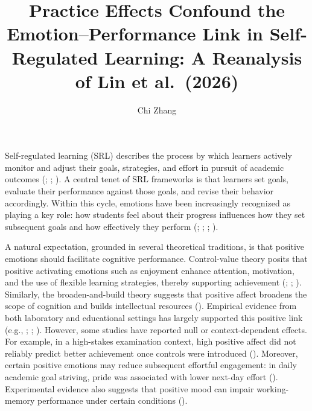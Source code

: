 \documentclass[
  man,
  floatsintext,
  longtable,
  nolmodern,
  notxfonts,
  notimes,
  colorlinks=true,linkcolor=blue,citecolor=blue,urlcolor=blue]{apa7}
\title{Practice Effects Confound the Emotion--Performance Link in
Self-Regulated Learning: A Reanalysis of Lin et al.~(2026)}
\author{Chi Zhang}
\affiliation{
{Manchester Institute of Education, The University of Manchester}}
\newlength{\cslhangindent}
\begin{document}
\maketitle




\setlength\LTleft{0pt}



\ifdefined\Shaded\renewenvironment{Shaded}{\begin{snugshade}\begin{singlespace}}{\end{singlespace}\end{snugshade}}\fi

\setlength{\cslhangindent}{0.5in}

Self-regulated learning (SRL) describes the process by which learners
actively monitor and adjust their goals, strategies, and effort in
pursuit of academic outcomes
(;
;
). A central tenet of
SRL frameworks is that learners set goals, evaluate their performance
against those goals, and revise their behavior accordingly. Within this
cycle, emotions have been increasingly recognized as playing a key role:
how students feel about their progress influences how they set
subsequent goals and how effectively they perform
(;
;
;
).

A natural expectation, grounded in several theoretical traditions, is
that positive emotions should facilitate cognitive performance.
Control-value theory posits that positive activating emotions such as
enjoyment enhance attention, motivation, and the use of flexible
learning strategies, thereby supporting achievement
(;
;
). Similarly, the
broaden-and-build theory suggests that positive affect broadens the
scope of cognition and builds intellectual resources
(). Empirical
evidence from both laboratory and educational settings has largely
supported this positive link (e.g.,
;
;
). However, some
studies have reported null or context-dependent effects. For example, in
a high-stakes examination context, high positive affect did not reliably
predict better achievement once controls were introduced
(). Moreover, certain
positive emotions may reduce subsequent effortful engagement: in daily
academic goal striving, pride was associated with lower next-day effort
(). Experimental
evidence also suggests that positive mood can impair working-memory
performance under certain conditions
().
\end{document}
